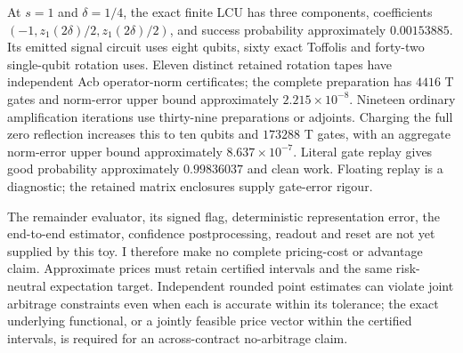 At $s=1$ and $\delta=1/4$, the exact finite LCU has three components,
coefficients $(-1,z_1(2\delta)/2,z_1(2\delta)/2)$, and success
probability approximately $0.00153885$. Its emitted signal circuit uses
eight qubits, sixty exact Toffolis and forty-two single-qubit rotation
uses. Eleven distinct retained rotation tapes have independent Acb
operator-norm certificates; the complete preparation has $4416$ T
gates and norm-error upper bound approximately $2.215\times10^{-8}$.
Nineteen ordinary amplification iterations use thirty-nine preparations
or adjoints. Charging the full zero reflection increases this to ten
qubits and $173288$ T gates, with an aggregate norm-error upper bound
approximately $8.637\times10^{-7}$. Literal gate replay gives good
probability approximately $0.99836037$ and clean work. Floating replay
is a diagnostic; the retained matrix enclosures supply gate-error rigour.

The remainder evaluator, its signed flag, deterministic representation
error, the end-to-end estimator, confidence postprocessing, readout and
reset are not yet supplied by this toy. I therefore make no complete
pricing-cost or advantage claim. Approximate prices must retain certified
intervals and the same risk-neutral expectation target. Independent
rounded point estimates can violate joint arbitrage constraints even
when each is accurate within its tolerance; the exact underlying
functional, or a jointly feasible price vector within the certified
intervals, is required for an across-contract no-arbitrage claim.
